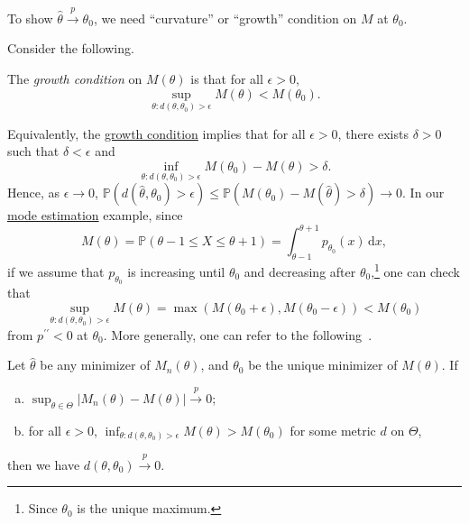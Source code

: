 To show \(\hat{\theta} \overset{p}{\to} \theta _0\), we need ``curvature'' or ``growth'' condition on \(M\) at \(\theta _0\).

\begin{center}
\end{center}

Consider the following.

\begin{definition}\label{def:growth-condition}
	The \emph{growth condition} on \(M(\theta )\) is that for all \(\epsilon > 0\),
	\[
		\sup _{\theta \colon d(\theta, \theta _0) > \epsilon } M(\theta ) < M(\theta _0).
	\]
\end{definition}

Equivalently, the \hyperref[def:growth-condition]{growth condition} implies that for all \(\epsilon > 0\), there exists \(\delta > 0\) such that \(\delta < \epsilon \) and
\[
	\inf _{\theta \colon d(\theta, \theta _0 ) > \epsilon } M(\theta _0) - M(\theta ) > \delta .
\]
Hence, as \(\epsilon \to 0\), \(\mathbb{P} (d(\hat{\theta} , \theta _0 ) > \epsilon ) \leq \mathbb{P} (M(\theta _0) - M(\hat{\theta} ) > \delta ) \to 0\). In our \hyperref[eg:mode-estimation]{mode estimation} example, since
\[
	M(\theta )
	= \mathbb{P} (\theta -1 \leq X \leq \theta +1)
	= \int_{\theta -1}^{\theta + 1} p_{\theta _0}(x) \,\mathrm{d}x,
\]
if we assume that \(p_{\theta _0}\) is increasing until \(\theta _0\) and decreasing after \(\theta _0\),\footnote{Since \(\theta _0\) is the unique maximum.} one can check that
\[
	\sup _{\theta \colon d(\theta, \theta _0) > \epsilon } M(\theta )
	= \max (M(\theta _0 + \epsilon ), M(\theta _0 - \epsilon ))
	< M(\theta _0)
\]
from \(p^{\prime\prime} < 0\) at \(\theta _0\). More generally, one can refer to the following~\cite[Theorem 5.7]{vaartAsymptoticStatistics1998}.

\begin{theorem}\label{thm:consistency}
	Let \(\hat{\theta} \) be any minimizer of \(M_n(\theta )\), and \(\theta _0\) be the unique minimizer of \(M(\theta )\). If
	\begin{enumerate}[(a)]
		\item\label{thm:consistency-a} \(\sup _{\theta \in \Theta } \vert M_n(\theta ) - M(\theta ) \vert \overset{p}{\to } 0\);
		\item for all \(\epsilon >0\), \(\inf _{\theta \colon d(\theta , \theta _0) > \epsilon } M(\theta ) > M(\theta _0)\) for some metric \(d\) on \(\Theta \),
	\end{enumerate}
	then we have \(d(\theta , \theta _0) \overset{p}{\to } 0\).
\end{theorem}

